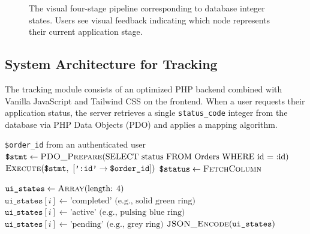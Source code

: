 \documentclass[journal, 10pt, twoside]{IEEEtran}
\begin{document}
\begin{figure}[ht]
  \centering
  \caption{The visual four-stage pipeline corresponding to database integer states. Users see visual feedback indicating which node represents their current application stage.}
  \label{fig:tracking_pipeline}
\end{figure}

\subsection{System Architecture for Tracking}
The tracking module consists of an optimized PHP backend combined with Vanilla JavaScript and Tailwind CSS on the frontend. When a user requests their application status, the server retrieves a single \texttt{status\_code} integer from the database via PHP Data Objects (PDO) and applies a mapping algorithm.

\begin{algorithm}[H]
\caption{Dynamic UI State Mapping for Tracker}\label{alg:tracker}
\begin{algorithmic}[1]
\Require \texttt{\$order\_id} from an authenticated user
    \State $\texttt{\$stmt} \gets \Call{PDO\_Prepare}{\text{SELECT status FROM Orders WHERE id = :id}}$
    \State $\Call{Execute}{\texttt{\$stmt},\ [\texttt{':id'} \to \texttt{\$order\_id}]}$
    \State $\texttt{\$status} \gets \Call{FetchColumn}{}$

    \State $\texttt{ui\_states} \gets \Call{Array}{\text{length: } 4}$
            \State $\texttt{ui\_states}[i] \gets \text{'completed' (e.g., solid green ring)}$
            \State $\texttt{ui\_states}[i] \gets \text{'active' (e.g., pulsing blue ring)}$
        \Else
            \State $\texttt{ui\_states}[i] \gets \text{'pending' (e.g., grey ring)}$
        \EndIf
    \EndFor
    \State \Return $\Call{JSON\_Encode}{\texttt{ui\_states}}$
\EndProcedure
\end{algorithmic}
\end{algorithm}
\end{document}
